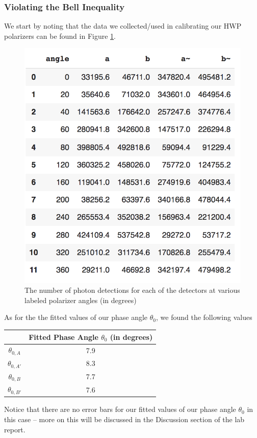 \documentclass[twocolumn,amsmath,amssymb,pra]{revtex4-2}
\begin{document}
\subsubsection{Violating the Bell Inequality}
We start by noting that the data we collected/used in calibrating our HWP polarizers can be found in Figure \ref{fig:theta_0_data}.
\begin{figure}
    \centering
    \includegraphics[width = 0.95 \linewidth]{theta_0_data.png}
    \caption{The number of photon detections for each of the detectors at various labeled polarizer angles (in degrees)}
    \label{fig:theta_0_data}
\end{figure}
As for the the fitted values of our phase angle $\theta_{0}$, we found the following values
\begin{center}
\begin{tabular}{||c | c||} 
 \hline
  & Fitted Phase Angle $\theta_{0}$ (in degrees)\\
 \hline
 $\theta_{0, A}$ & 7.9 \\ 
 \hline
 $\theta_{0, A'}$ & 8.3  \\
  \hline
 $\theta_{0, B}$ &7.7   \\
  \hline
 $\theta_{0, B'}$ & 7.6  \\
 \hline
\end{tabular}
\end{center}
Notice that there are no error bars for our fitted values of our phase angle $\theta_{0}$ in this case -- more on this will be discussed in the Discussion section of the lab report. 
\end{document}
